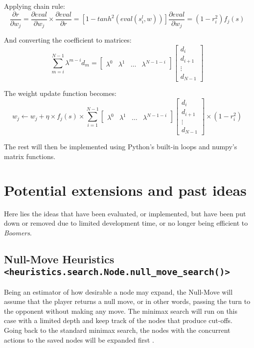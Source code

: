 \documentclass[]{article}
\begin{document}
Applying chain rule:
\[
\frac{\partial r}{\partial w_j} 
= \frac{\partial eval}{\partial w_j}\times\frac{\partial eval}{\partial r} 
= [1-tanh^2(eval(s^l_i,w))]\frac{\partial eval}{\partial w_j} 
= (1-r^2_i)f_j(s)
\]

And converting the coefficient to matrices:
\[
\displaystyle\sum_{m=i}^{N-1} \lambda^{m-i}d_m = 
\begin{bmatrix}
       \lambda^0 & \lambda^1 & \dots & \lambda^{N-1-i}    
\end{bmatrix}
\begin{bmatrix}
       d_i \\ d_{i+1} \\ \vdots \\ d_{N-1}    
\end{bmatrix}
\]

The weight update function becomes:
\[
w_j \gets w_j + \eta \times f_j(s) \times \displaystyle\sum_{i=1}^{N-1}
\begin{bmatrix}
       \lambda^0 & \lambda^1 & \dots & \lambda^{N-1-i}    
\end{bmatrix}
\begin{bmatrix}
       d_i \\ d_{i+1} \\ \vdots \\ d_{N-1}    
\end{bmatrix}
\times (1-r^2_i)
\]

The rest will then be implemented using Python's built-in loops and numpy's matrix functions.

\section{Potential extensions and past ideas}

Here lies the ideas that have been evaluated, or implemented, but have been put down or removed due to limited development time, or no longer being efficient to \emph{Boomers}.

\subsection{Null-Move Heuristics \texttt{<heuristics.search.Node.null\_move\_search()>}}

Being an estimator of how desirable a node may expand, the Null-Move will assume that the player returns a null move, or in other words, passing the turn to the opponent without making any move. The minimax search will run on this case with a limited depth and keep track of the nodes that produce cut-offs. Going back to the standard minimax search, the nodes with the concurrent actions to the saved nodes will be expanded first \cite{null}.\\
\end{document}
